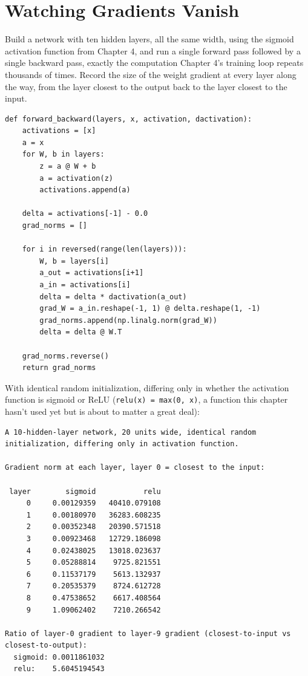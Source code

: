 \section*{Watching Gradients Vanish}

Build a network with ten hidden layers, all the same width, using the sigmoid activation function from Chapter 4, and run a single forward pass followed by a single backward pass, exactly the computation Chapter 4's training loop repeats thousands of times. Record the size of the weight gradient at every layer along the way, from the layer closest to the output back to the layer closest to the input.

\begin{Verbatim}[fontsize=\small, frame=single, xleftmargin=1em, xrightmargin=1em]
def forward_backward(layers, x, activation, dactivation):
    activations = [x]
    a = x
    for W, b in layers:
        z = a @ W + b
        a = activation(z)
        activations.append(a)

    delta = activations[-1] - 0.0
    grad_norms = []

    for i in reversed(range(len(layers))):
        W, b = layers[i]
        a_out = activations[i+1]
        a_in = activations[i]
        delta = delta * dactivation(a_out)
        grad_W = a_in.reshape(-1, 1) @ delta.reshape(1, -1)
        grad_norms.append(np.linalg.norm(grad_W))
        delta = delta @ W.T

    grad_norms.reverse()
    return grad_norms
\end{Verbatim}

With identical random initialization, differing only in whether the activation function is sigmoid or ReLU (\texttt{relu(x) = max(0, x)}, a function this chapter hasn't used yet but is about to matter a great deal):

\begin{Verbatim}[fontsize=\small, frame=single, xleftmargin=1em, xrightmargin=1em]
A 10-hidden-layer network, 20 units wide, identical random
initialization, differing only in activation function.

Gradient norm at each layer, layer 0 = closest to the input:

 layer        sigmoid           relu
     0     0.00129359   40410.079108
     1     0.00180970   36283.608235
     2     0.00352348   20390.571518
     3     0.00923468   12729.186098
     4     0.02438025   13018.023637
     5     0.05288814    9725.821551
     6     0.11537179    5613.132937
     7     0.20535379    8724.612728
     8     0.47538652    6617.408564
     9     1.09062402    7210.266542

Ratio of layer-0 gradient to layer-9 gradient (closest-to-input vs closest-to-output):
  sigmoid: 0.0011861032
  relu:    5.6045194543
\end{Verbatim}

